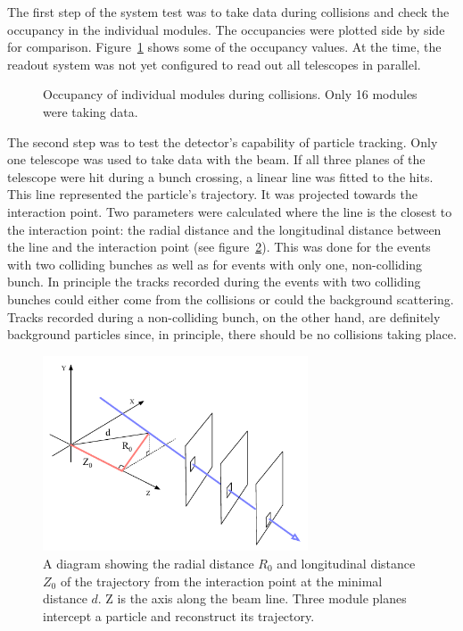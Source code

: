 \documentclass[12pt]{packages/mytustyle}  %
\begin{document}
The first step of the system test was to take data during collisions and check the occupancy in the individual modules. The occupancies were plotted side by side for comparison. Figure~\ref{fig:collocc} shows some of the occupancy values. At the time, the readout system was not yet configured to read out all telescopes in parallel. 
\begin{figure}[!t]
\centering
\caption{Occupancy of individual modules during collisions. Only 16 modules were taking data.}
\label{fig:collocc}
\end{figure}

The second step was to test the detector's capability of particle tracking. Only one telescope was used to take data with the beam. If all three planes of the telescope were hit during a bunch crossing, a linear line was fitted to the hits. This line represented the particle's trajectory. It was projected towards the interaction point. Two parameters were calculated where the line is the closest to the interaction point: the radial distance and the longitudinal distance between the line and the interaction point (see figure~\ref{fig:z-r-distance}). This was done for the events with two colliding bunches as well as for events with only one, non-colliding bunch. In principle the tracks recorded during the events with two colliding bunches could either come from the collisions or could the background scattering. Tracks recorded during a non-colliding bunch, on the other hand, are definitely background particles since, in principle, there should be no collisions taking place. 
\begin{figure}[!t]
\centering
\includegraphics[width=0.7\textwidth]{../../scripts/04_charge_monitoring/plots/z-r-distance}
\caption{A diagram showing the radial distance $R_0$ and longitudinal distance $Z_0$ of the trajectory from the interaction point at the minimal distance $d$. Z is the axis along the beam line. Three module planes intercept a particle and reconstruct its trajectory.}
\label{fig:z-r-distance}
\end{figure}
\end{document}
